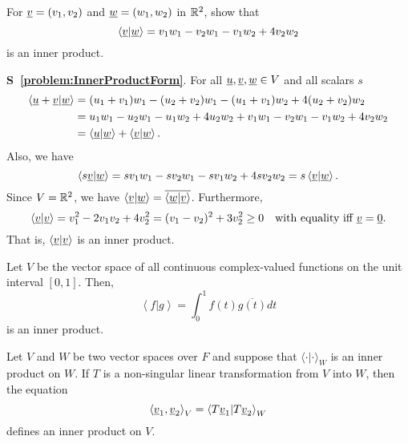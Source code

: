 \begin{problem} \label{problem:InnerProductForm}
For $\underline{v} = (v_1, v_2)$ and $\underline{w} = (w_1, w_2)$  in $\mathbb{R}^2$, show that
\begin{equation*}
\left\langle \underline{v} | \underline{w} \right\rangle
= v_1 w_1 - v_2 w_1 - v_1 w_2 + 4 v_2 w_2
\end{equation*}
is an inner product.
\end{problem}
\noindent \textbf{S~\ref{problem:InnerProductForm}}.
For all $\underline{u}, \underline{v}, \underline{w} \in V$ and all scalars $s$
\begin{equation*}
\begin{split}
\left\langle \underline{u} + \underline{v} | \underline{w} \right\rangle
&= (u_1 + v_1) w_1 - (u_2 + v_2) w_1 - (u_1 + v_1) w_2 + 4 (u_2 + v_2) w_2 \\
&= u_1 w_1 - u_2 w_1 - u_1 w_2 + 4 u_2 w_2
+ v_1 w_1 - v_2 w_1 - v_1 w_2 + 4 v_2 w_2 \\
&= \left\langle \underline{u} | \underline{w} \right\rangle
+ \left\langle \underline{v} | \underline{w} \right\rangle.
\end{split}
\end{equation*}
Also, we have
\begin{equation*}
\left\langle s \underline{v} | \underline{w} \right\rangle
= s v_1 w_1 - s v_2 w_1 - s v_1 w_2 + 4 s v_2 w_2
= s \left\langle \underline{v} | \underline{w} \right\rangle.
\end{equation*}
Since $V = \mathbb{R}^2$, we have $\left\langle \underline{v} | \underline{w} \right\rangle = \overline{ \left\langle \underline{w} | \underline{v} \right\rangle }$.
Furthermore,
\begin{equation*}
\left\langle \underline{v} | \underline{v} \right\rangle
= v_1^2 - 2 v_1 v_2 + 4 v_2^2
= ( v_1 - v_2 )^2 + 3 v_2^2
\geq 0
\quad \text{with equality iff } \underline{v} = \underline{0}.
\end{equation*}
That is, $\left\langle \underline{v} | \underline{v} \right\rangle$ is an inner product.


\begin{example}
Let $V$ be the vector space of all continuous complex-valued functions on the unit interval $[0,1]$.
Then,
\begin{equation*}
\left\langle f | g \right\rangle
= \int_0^1 f(t) \overline{g(t)} dt
\end{equation*}
is an inner product.
\end{example}

\begin{example}
Let $V$ and $W$ be two vector spaces over $F$ and suppose that $\langle \cdot | \cdot \rangle_W$ is an inner product on $W$.
If $T$ is a non-singular linear transformation from $V$ into $W$, then the equation
\begin{equation*}
\left\langle \underline{v}_1, \underline{v}_2 \right\rangle_V
= \left\langle T \underline{v}_1 | T \underline{v}_2 \right\rangle_W
\end{equation*}
defines an inner product on $V$.
\end{example}

